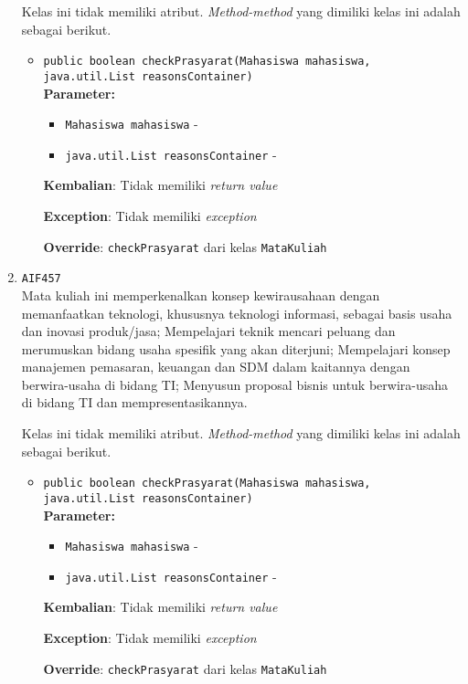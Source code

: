 \documentclass{article}
\begin{document}
\begin{enumerate}
Kelas ini tidak memiliki atribut. \textit{Method-method} yang dimiliki kelas ini adalah sebagai berikut.
\begin{itemize}
\item \texttt{public boolean checkPrasyarat(Mahasiswa mahasiswa, java.util.List reasonsContainer)}\\ 


\textbf{Parameter:}\begin{itemize}
\item \texttt{Mahasiswa mahasiswa} - 
\item \texttt{java.util.List reasonsContainer} - 
\end{itemize}
\textbf{Kembalian}: Tidak memiliki \textit{return value}

\textbf{Exception}: Tidak memiliki \textit{exception}

\textbf{Override}: \texttt{checkPrasyarat} dari kelas \texttt{MataKuliah}

\end{itemize}
\item \texttt{AIF457}\\ 
Mata kuliah ini memperkenalkan konsep kewirausahaan dengan memanfaatkan teknologi, khususnya
 teknologi informasi, sebagai basis usaha dan inovasi produk/jasa; Mempelajari
 teknik mencari peluang dan merumuskan bidang usaha spesifik yang akan
 diterjuni; Mempelajari konsep manajemen pemasaran, keuangan dan SDM dalam
 kaitannya dengan berwira-usaha di bidang TI; Menyusun proposal bisnis untuk
 berwira-usaha di bidang TI dan mempresentasikannya.

Kelas ini tidak memiliki atribut. \textit{Method-method} yang dimiliki kelas ini adalah sebagai berikut.
\begin{itemize}
\item \texttt{public boolean checkPrasyarat(Mahasiswa mahasiswa, java.util.List reasonsContainer)}\\ 


\textbf{Parameter:}\begin{itemize}
\item \texttt{Mahasiswa mahasiswa} - 
\item \texttt{java.util.List reasonsContainer} - 
\end{itemize}
\textbf{Kembalian}: Tidak memiliki \textit{return value}

\textbf{Exception}: Tidak memiliki \textit{exception}

\textbf{Override}: \texttt{checkPrasyarat} dari kelas \texttt{MataKuliah}


\end{itemize}
\end{enumerate}
\end{document}
